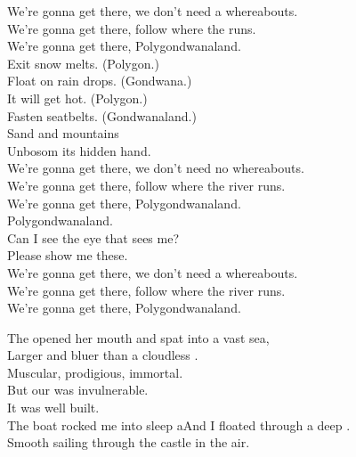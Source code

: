 We're gonna get there, we don't need a whereabouts. \\
We're gonna get there, follow where the  runs. \\
We're gonna get there, Polygondwanaland. \\

Exit snow melts. (Polygon.) \\
Float on rain drops. (Gondwana.) \\
It will get hot. (Polygon.) \\
Fasten seatbelts. (Gondwanaland.) \\

Sand and mountains \\
Unbosom its hidden hand. \\

We're gonna get there, we don't need no whereabouts. \\
We're gonna get there, follow where the river runs. \\
We're gonna get there, Polygondwanaland. \\

Polygondwanaland. \\
Can I see the eye that sees me? \\
Please show me these. \\

We're gonna get there, we don't need a whereabouts. \\
We're gonna get there, follow where the river runs. \\
We're gonna get there, Polygondwanaland. \\





The  opened her mouth and spat into a vast sea, \\
Larger and bluer than a cloudless . \\
Muscular, prodigious, immortal. \\
But our  was invulnerable. \\

It was well built. \\
The boat rocked me into sleep aAnd I floated through a deep . \\
Smooth sailing through the castle in the air. \\

